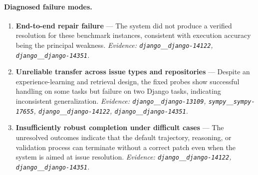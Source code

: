 \paragraph{Diagnosed failure modes.}\begin{enumerate}\itemsep1pt
\item \textbf{End-to-end repair failure} --- The system did not produce a verified resolution for these benchmark instances, consistent with execution accuracy being the principal weakness. \emph{Evidence: \texttt{django\_\_django-14122}, \texttt{django\_\_django-14351}.}
\item \textbf{Unreliable transfer across issue types and repositories} --- Despite an experience-learning and retrieval design, the fixed probes show successful handling on some tasks but failure on two Django tasks, indicating inconsistent generalization. \emph{Evidence: \texttt{django\_\_django-13109}, \texttt{sympy\_\_sympy-17655}, \texttt{django\_\_django-14122}, \texttt{django\_\_django-14351}.}
\item \textbf{Insufficiently robust completion under difficult cases} --- The unresolved outcomes indicate that the default trajectory, reasoning, or validation process can terminate without a correct patch even when the system is aimed at issue resolution. \emph{Evidence: \texttt{django\_\_django-14122}, \texttt{django\_\_django-14351}.}
\end{enumerate}
